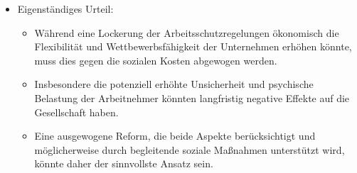 \documentclass[12pt,a4paper]{report}
\begin{document}
\begin{itemize}
\begin{itemize}
\begin{itemize}
        \end{itemize}
    	\end{itemize}
    	\item Eigenständiges Urteil:
    	\begin{itemize}
      	\item Während eine Lockerung der Arbeitsschutzregelungen ökonomisch die Flexibilität und Wettbewerbsfähigkeit der Unternehmen erhöhen könnte, muss dies gegen die sozialen Kosten abgewogen werden.
      	\item Insbesondere die potenziell erhöhte Unsicherheit und psychische Belastung der Arbeitnehmer könnten langfristig negative Effekte auf die Gesellschaft haben.
      	\item Eine ausgewogene Reform, die beide Aspekte berücksichtigt und möglicherweise durch begleitende soziale Maßnahmen unterstützt wird, könnte daher der sinnvollste Ansatz sein.
    	\end{itemize}
	\end{itemize}
	
\end{document}
